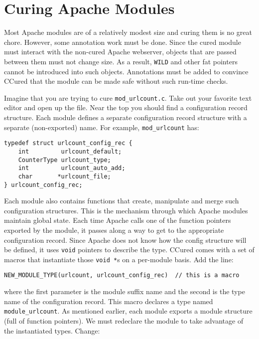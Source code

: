 \documentclass{book}
\begin{document}
\section{Curing Apache Modules}

Most Apache modules are of a relatively modest size and curing them is no
great chore. However, some annotation work must be done. Since the cured
module must interact with the non-cured Apache webserver, objects that are
passed between them must not change size. As a result, {\tt WILD} and other
fat pointers cannot be introduced into such objects. Annotations must be
added to convince CCured that the module can be made safe without such
run-time checks. 

Imagine that you are trying to cure {\tt mod\_urlcount.c}.  Take out your
favorite text editor and open up the file. Near the top you should find a
configuration record structure. Each module defines a separate
configuration record structure with a separate (non-exported) name. For
example, {\tt mod\_urlcount} has:

\begin{verbatim}
typedef struct urlcount_config_rec {
    int         urlcount_default;
    CounterType urlcount_type;
    int         urlcount_auto_add;
    char       *urlcount_file;
} urlcount_config_rec;
\end{verbatim}

Each module also contains functions that create, manipulate and merge such
configuration structures. This is the mechanism through which Apache modules
maintain global state. Each time Apache calls one of the function pointers
exported by the module, it passes along a way to get to the appropriate
configuration record. Since Apache does not know how the config structure
will be defined, it uses {\tt void} pointers to describe the type. CCured
comes with a set of macros that instantiate those {\tt void *}s on a
per-module basis. Add the line:

\begin{verbatim}
NEW_MODULE_TYPE(urlcount, urlcount_config_rec)  // this is a macro
\end{verbatim}

where the first parameter is the module suffix name and the second is the
type name of the configuration record. This macro declares a type named
{\tt module\_urlcount}.  As mentioned earlier, each module exports a module
structure (full of function pointers). We must redeclare the module to take
advantage of the instantiated types. Change:
\end{document}
